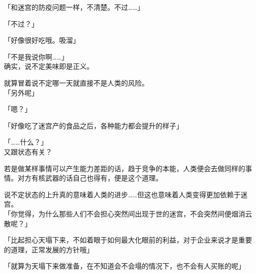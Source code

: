 「和迷宫的防疫问题一样，不清楚。不过……」

「不过？」

「好像很好吃哦。吸溜」

「不是我说你啊……」\\

确实，说不定美味即是正义。

就算冒着说不定哪一天就直接不是人类的风险。\\

「另外呢」

「嗯？」

「好像吃了迷宫产的食品之后，各种能力都会提升的样子」

「……什么？」\\

又跟状态有关？

若是做某样事情可以产生能力差距的话，趋于竞争的本能，人类便会去做同样的事情。对方有核武器的话自己也得有，便是这个道理。

说不定状态的上升真的意味着人类的进步……但这也意味着人类变得更加依赖于迷宫。\\

「你觉得，为什么那些人们不会担心突然间出现于世的迷宫，不会突然间便烟消云散呢？」

「比起担心天塌下来，不如着眼于如何最大化眼前的利益，对于企业来说才是重要的道理，正常发展的方针哦」

「就算为天塌下来做准备，在不知道会不会塌的情况下，也不会有人买账的呢」

